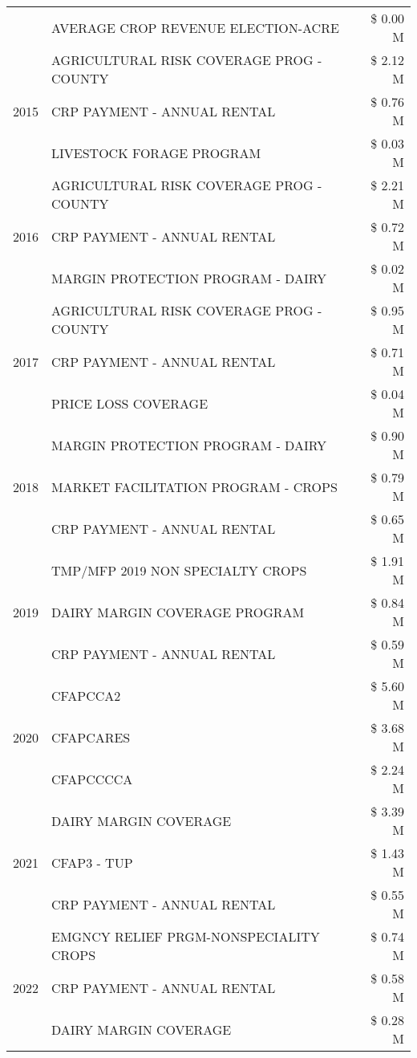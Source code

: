 \begin{tabular}{llr}
 & AVERAGE CROP REVENUE ELECTION-ACRE & \$ 0.00 M \\
\cline{1-3}
\multirow[t]{3}{*}{2015} & AGRICULTURAL RISK COVERAGE PROG - COUNTY & \$ 2.12 M \\
 & CRP PAYMENT - ANNUAL RENTAL & \$ 0.76 M \\
 & LIVESTOCK FORAGE PROGRAM & \$ 0.03 M \\
\cline{1-3}
\multirow[t]{3}{*}{2016} & AGRICULTURAL RISK COVERAGE PROG - COUNTY & \$ 2.21 M \\
 & CRP PAYMENT - ANNUAL RENTAL & \$ 0.72 M \\
 & MARGIN PROTECTION PROGRAM - DAIRY & \$ 0.02 M \\
\cline{1-3}
\multirow[t]{3}{*}{2017} & AGRICULTURAL RISK COVERAGE PROG - COUNTY & \$ 0.95 M \\
 & CRP PAYMENT - ANNUAL RENTAL & \$ 0.71 M \\
 & PRICE LOSS COVERAGE & \$ 0.04 M \\
\cline{1-3}
\multirow[t]{3}{*}{2018} & MARGIN PROTECTION PROGRAM - DAIRY & \$ 0.90 M \\
 & MARKET FACILITATION PROGRAM - CROPS & \$ 0.79 M \\
 & CRP PAYMENT - ANNUAL RENTAL & \$ 0.65 M \\
\cline{1-3}
\multirow[t]{3}{*}{2019} & TMP/MFP 2019 NON SPECIALTY CROPS & \$ 1.91 M \\
 & DAIRY MARGIN COVERAGE PROGRAM & \$ 0.84 M \\
 & CRP PAYMENT - ANNUAL RENTAL & \$ 0.59 M \\
\cline{1-3}
\multirow[t]{3}{*}{2020} & CFAPCCA2 & \$ 5.60 M \\
 & CFAPCARES & \$ 3.68 M \\
 & CFAPCCCCA & \$ 2.24 M \\
\cline{1-3}
\multirow[t]{3}{*}{2021} & DAIRY MARGIN COVERAGE & \$ 3.39 M \\
 & CFAP3 - TUP & \$ 1.43 M \\
 & CRP PAYMENT - ANNUAL RENTAL & \$ 0.55 M \\
\cline{1-3}
\multirow[t]{3}{*}{2022} & EMGNCY RELIEF PRGM-NONSPECIALITY CROPS & \$ 0.74 M \\
 & CRP PAYMENT - ANNUAL RENTAL & \$ 0.58 M \\
 & DAIRY MARGIN COVERAGE & \$ 0.28 M \\
\cline{1-3}
\bottomrule
\end{tabular}
